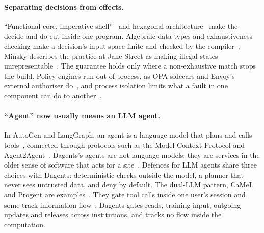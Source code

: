 \paragraph{Separating decisions from effects.} ``Functional core, imperative
shell''~\citep{bernhardt2012boundaries} and hexagonal
architecture~\citep{cockburn2005hexagonal} make the decide-and-do cut inside
one program. Algebraic data types and exhaustiveness checking make a decision's
input space finite and checked by the compiler~\citep{maranget2007warnings};
Minsky describes the practice at Jane Street as making illegal states
unrepresentable~\citep{minsky2008caml,minsky2011ocaml}. The guarantee holds only
where a non-exhaustive match stops the build. Policy engines run out of
process, as OPA sidecars and Envoy's external authoriser
do~\citep{opa_deploy,envoy_extauthz}, and process isolation limits what a fault
in one component can do to another~\citep{reis2009isolating}.

\paragraph{``Agent'' now usually means an LLM agent.} In AutoGen and LangGraph,
an agent is a language model that plans and calls
tools~\citep{wu2023autogen,langgraph_docs,anthropic2024building}, connected
through protocols such as the Model Context Protocol and
Agent2Agent~\citep{mcp2025specification,a2a_protocol}. Dagents's agents are
not language models; they are services in the older sense of software that acts
for a site~\citep{wooldridge1995intelligent}. Defences for LLM agents share
three choices with Dagents: deterministic checks outside the model, a planner
that never sees untrusted data, and deny by default. The dual-LLM pattern, CaMeL
and Progent are examples~\citep{willison2023dual,debenedetti2026defeating,shi2025progent,beurerkellner2025design}.
They gate tool calls inside one user's session and some track information
flow~\citep{costa2025fides}; Dagents gates reads, training input, outgoing
updates and releases across institutions, and tracks no flow inside the
computation.

